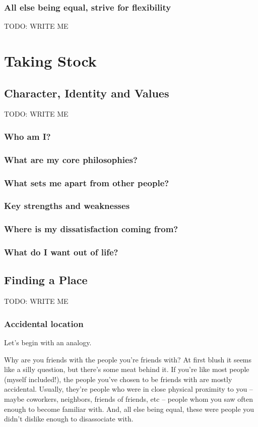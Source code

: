 \documentclass[]{book}
\newcommand{\TOWRITE}{TODO: WRITE ME}
\begin{document}
\section{All else being equal, strive for flexibility}

\TOWRITE


\part{Taking Stock}

\chapter{Character, Identity and Values}
\TOWRITE

\section{Who am I?}
\section{What are my core philosophies?}
\section{What sets me apart from other people?}
\section{Key strengths and weaknesses}
\section{Where is my dissatisfaction coming from?}
\section{What do I want out of life?}

\chapter{Finding a Place}
\TOWRITE


\section{Accidental location}

Let's begin with an analogy.

Why are you friends with the people you're friends with? At first blush it seems
like a silly question, but there's some meat behind it. If you're like most
people (myself included!), the people you've chosen to be friends with are
mostly accidental. Usually, they're people who were in close physical proximity
to you -- maybe coworkers, neighbors, friends of friends, etc -- people whom you
saw often enough to become familiar with. And, all else being equal, these were
people you didn't dislike enough to disassociate with.
\end{document}
